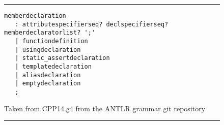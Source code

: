 \begin{figure}[H]
\noindent\rule{\textwidth}{1pt}
\begin{lstlisting}[language=AntlrGrammar, caption={Rule for memberdeclaration}, label={lst:antlrCppGrammarRuleExample}]
memberdeclaration
   : attributespecifierseq? declspecifierseq? memberdeclaratorlist? ';'
   | functiondefinition
   | usingdeclaration
   | static_assertdeclaration
   | templatedeclaration
   | aliasdeclaration
   | emptydeclaration
   ;
\end{lstlisting}
\medskip
\small
Taken from CPP14.g4 \cite{git:cpp14_g4} from the ANTLR grammar \gls{git} repository
\noindent\rule{\textwidth}{1pt}
\end{figure}